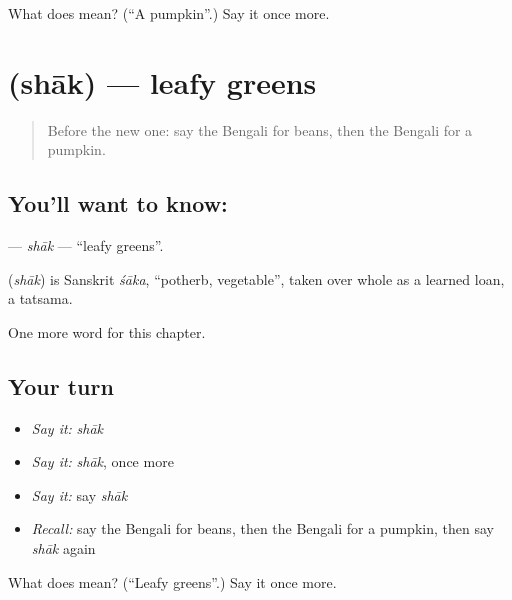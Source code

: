 \begin{tcolorbox}[breakable,colback=teal!4,colframe=teal!35!black,title={Before you move on}]
What does  mean? (\textquotedblleft{}A pumpkin\textquotedblright{}.) Say it once more.
\end{tcolorbox}
\section[\texorpdfstring{\bn{শাক} (shāk)}{শাক (shāk)}]{ (shāk) — leafy greens}

\label{lesson:BN-C117-shak}



\begin{quote}
Before the new one: say the Bengali for beans, then the Bengali for a pumpkin.
\end{quote}

\subsection*{You'll want to know: }
\textbf{} — \emph{shāk} — \textquotedblleft{}leafy greens\textquotedblright{}.

\begin{cousinweb}
\textbf{} (\emph{shāk}) is Sanskrit \emph{śāka}, \textquotedblleft{}potherb, vegetable\textquotedblright{}, taken over whole as a learned loan, a tatsama.
\end{cousinweb}

\begin{grammarlens}[title={What you've built}]
One more word for this chapter.
\end{grammarlens}

\subsection*{Your turn}
\begin{itemize}
\raggedright
  \item \emph{Say it:} \emph{shāk}
  \item \emph{Say it:} \emph{shāk}, once more
  \item \emph{Say it:} say \emph{shāk}
  \item \emph{Recall:} say the Bengali for beans, then the Bengali for a pumpkin, then say \emph{shāk} again
\end{itemize}

\begin{tcolorbox}[breakable,colback=teal!4,colframe=teal!35!black,title={Before you move on}]
What does  mean? (\textquotedblleft{}Leafy greens\textquotedblright{}.) Say it once more.
\end{tcolorbox}
